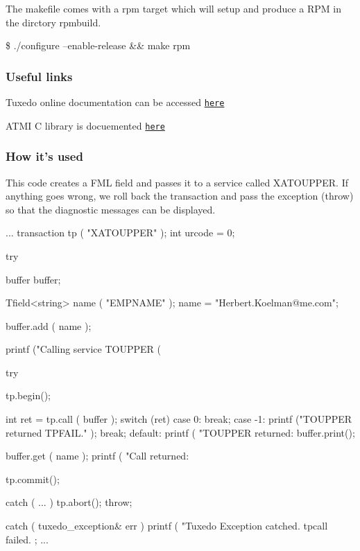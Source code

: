 The makefile comes with a {\ttfamily rpm} target which will setup and produce a R\+P\+M in the dirctory {\ttfamily rpmbuild}.

\$ ./configure --enable-\/release \&\& make rpm

\subsubsection*{Useful links}


\begin{DoxyItemize}
\item Tuxedo online documentation can be accessed \href{http://docs.oracle.com/cd/E35855_01/tuxedo/docs12c/index.html}{\tt here}
\item A\+T\+M\+I C library is docuemented \href{http://docs.oracle.com/cd/E35855_01/tuxedo/docs12c/rf3c/rf3c.html}{\tt here}
\end{DoxyItemize}

\subsubsection*{How it's used}

This code creates a F\+M\+L field and passes it to a service called {\ttfamily X\+A\+T\+O\+U\+P\+P\+E\+R}. If anything goes wrong, we roll back the transaction and pass the exception ({\ttfamily throw}) so that the diagnostic messages can be displayed. \begin{DoxyVerb}    ...
    transaction tp ( "XATOUPPER" );
    int urcode = 0;

    try {

      buffer buffer;

      Tfield<string> name ( "EMPNAME" );
      name = "Herbert.Koelman@me.com";

      buffer.add ( name );

      printf ("Calling service TOUPPER (%

      try {

        tp.begin();

        int ret = tp.call ( buffer );
        switch (ret) {
          case 0:
            break;
          case -1:
            printf ("TOUPPER returned TPFAIL.\n" );
            break;
          default:
            printf ( "TOUPPER returned: %
            buffer.print();
        }

        buffer.get ( name );
        printf ( "Call returned: %

        tp.commit();
      } catch ( ... ){
        tp.abort();
        throw;
      }

    } catch ( tuxedo_exception& err ) {
      printf ( "Tuxedo Exception catched. tpcall failed. %
    };
    ...
\end{DoxyVerb}


